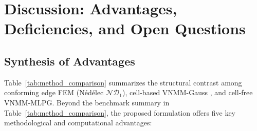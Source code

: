 \documentclass[VANCOUVER]{USG}
\begin{document}
\section{Discussion: Advantages, Deficiencies, and Open Questions}
\label{sec:discussion}

\subsection{Synthesis of Advantages}
\label{subsec:advantages_synthesis}

Table~\ref{tab:method_comparison} summarizes the structural contrast among conforming edge FEM (N\'{e}d\'{e}lec $\mathcal{ND}_1$), cell-based VNMM-Gauss \cite{stable_vnmm2d_2026}, and cell-free VNMM-MLPG. Beyond the benchmark summary in Table~\ref{tab:method_comparison}, the proposed formulation offers five key methodological and computational advantages:
\end{document}
